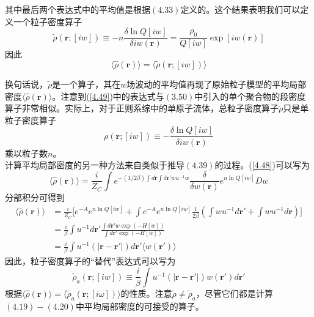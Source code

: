 其中最后两个表达式中的平均值是根据$(4.33)$定义的。这个结果表明我们可以定义一个粒子密度算子\\
\begin{equation}
\tilde{ \rho }(\mathbf{r};[i w]) \equiv -n \frac{\delta \ln Q[i w]}{\delta i w (\mathbf{r})} = \frac{\rho _{0}}{Q[i w]} \exp [i w(\mathbf{r})]
\label{4.49}
\end{equation}
因此\\
\begin{equation}
\langle \hat{ \rho }(\mathbf{r}) \rangle = \langle \tilde{ \rho } (\mathbf{r};[i w ]) \rangle
\end{equation}

换句话说，$\tilde{ \rho }$是一个算子，其在$ w $场波动的平均值再现了原始粒子模型的平均局部密度$ \langle \hat{ \rho }(\mathbf{r}) \rangle $。注意到(\ref{4.49})中的表达式与$(3.50)$中引入的单个聚合物的段密度算子非常相似。实际上，对于正则系综中的单原子流体，总粒子密度算子$ \tilde{ \rho } $只是单粒子密度算子\\
\begin{equation}
\rho (\mathbf{r};[i w]) \equiv - \frac{\delta \ln Q[i w]}{\delta i w (\mathbf{r})}
\end{equation}
乘以粒子数$n$。\\

计算平均局部密度的另一种方法来自类似于推导$(4.39)$的过程。(\ref{4.48})可以写为\\
\begin{equation}
\langle \hat{ \rho } (\mathbf{r}) \rangle = \frac{i}{Z_{C}} \int e^{- (1/2 \beta ) \int d\mathbf{r} \int d\mathbf{r'} w u^{-1} w } \frac{ \delta }{\delta w (\mathbf{r})} e^{n \ln Q[i w ]} D w
\end{equation}
分部积分可得到\\
\begin{equation}
\begin{aligned}
\langle \hat{ \rho } (\mathbf{r}) \rangle &=\frac{i}{Z_{C}} \bigg[ e^{-A} e^{n \ln Q[i w ]}+\int e^{-A} e^{n \ln Q[i w ]} \frac{1}{2 \beta}(\int wu^{-1}d\mathbf{r'}+\int wu^{-1}d\mathbf{r}) \bigg ]\\&=\frac{i}{\beta}\int u^{-1} d \mathbf{r'} \frac{\int d\mathbf{r'}w \exp(-H[w])}{\int d\mathbf{r'} \exp(-H[w])} \\&= \frac{i}{ \beta } \int u^{-1} (|\mathbf{r-r'}|) d\mathbf{r'} \langle w (\mathbf{r'}) \rangle 
\end{aligned}
\label{4.53}
\end{equation}
因此，粒子密度算子的“替代”表达式可以写为\\
\begin{equation}
\tilde{ \rho }_{a}(\mathbf{r};[i w ]) \equiv \frac{i}{ \beta } \int  u^{-1}(|\mathbf{r-r'}|) w (\mathbf{r'})d\mathbf{r'}
\label{4.54}
\end{equation}
根据$\langle \hat{ \rho }(\mathbf{r}) \rangle = \langle \tilde{ \rho }_{a}(\mathbf{r};[i \omega ]) \rangle$的性质。注意$\tilde{ \rho } \neq \tilde{ \rho }_{a}$，尽管它们都是计算$(4.19)-(4.20)$中平均局部密度的可接受的算子。\\

